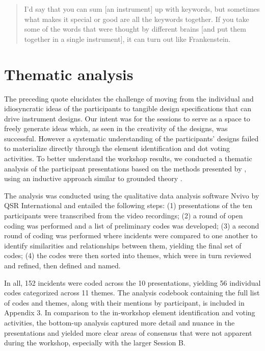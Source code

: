 \documentclass[letterpaper, 12pt]{article}
\begin{document}
\begin{quote}
   I'd say that you can sum [an instrument] up with keywords, but sometimes what makes it special or good are all the keywords together. If you take some of the words that were thought by different brains [and put them together in a single instrument], it can turn out like Frankenstein.
\end{quote}

\section{Thematic analysis}
\label{sec:thematic-analysis}

The preceding quote elucidates the challenge of moving from the individual and idiosyncratic ideas of the participants to tangible design specifications that can drive instrument designs. Our intent was for the sessions to serve as a space to freely generate ideas which, as seen in the creativity of the designs, was successful. However a systematic understanding of the participants' designs failed to materialize directly through the element identification and dot voting activities. To better understand the workshop results, we conducted a thematic analysis of the participant presentations based on the methods presented by \citet{Braun2006}, using an inductive approach similar to grounded theory \citep{Strauss1994}. 

The analysis was conducted using the qualitative data analysis software Nvivo by QSR International and entailed the following steps: (1) presentations of the ten participants were transcribed from the video recordings; (2) a round of open coding was performed and a list of preliminary codes was developed; (3) a second round of coding was performed where incidents were compared to one another to identify similarities and relationships between them, yielding the final set of codes; (4) the codes were then sorted into themes, which were in turn reviewed and refined, then defined and named.

In all, 152 incidents were coded across the 10 presentations, yielding 56 individual codes categorized across 11 themes. The analysis codebook containing the full list of codes and themes, along with their mentions by participant, is included in Appendix 3. In comparison to the in-workshop element identification and voting activities, the bottom-up analysis captured more detail and nuance in the presentations and yielded more clear areas of consensus that were not apparent during the workshop, especially with the larger Session B.
\end{document}
